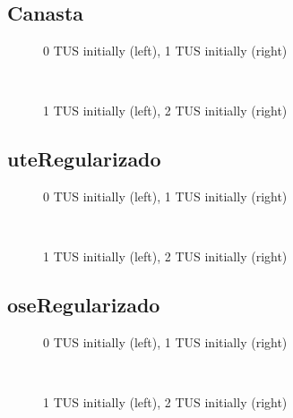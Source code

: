 \documentclass[12pt]{article}
\begin{document}
\subsection{Canasta}
\begin{figure}[H]%
	\centering
	\caption*{0 TUS initially (left), 1 TUS initially (right)}
	 \quad 
	 \\
	
	\caption*{1 TUS initially (left), 2 TUS initially (right)}
	 \qquad
	\label{fig:canastaTwo}%
\end{figure}

\subsection{uteRegularizado}
\begin{figure}[H]%
	\centering
	\caption*{0 TUS initially (left), 1 TUS initially (right)}
	 \quad 
	 \\
	
	\caption*{1 TUS initially (left), 2 TUS initially (right)}
	 \qquad
	\label{fig:uteRegularizadoTwo}%
\end{figure}

\subsection{oseRegularizado}
\begin{figure}[H]%
	\centering
	\caption*{0 TUS initially (left), 1 TUS initially (right)}
	 \quad 
	 \\
	
	\caption*{1 TUS initially (left), 2 TUS initially (right)}
	 \qquad
	\label{fig:oseRegularizadoTwo}%
\end{figure}
\end{document}
